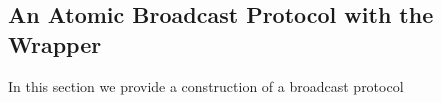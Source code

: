 \subsection{An Atomic Broadcast Protocol with the Wrapper}
In this section we provide a construction of a broadcast protocol 


%
%
%
%
